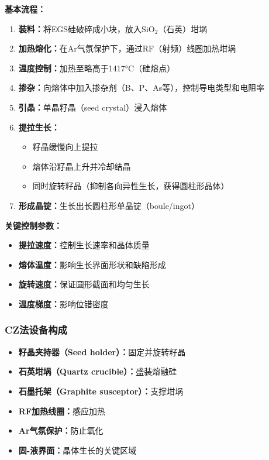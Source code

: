 \documentclass[UTF8,12pt,a4paper]{ctexart}
\begin{document}
\textbf{基本流程：}

\begin{enumerate}
    \item \textbf{装料：}将EGS硅破碎成小块，放入SiO$_2$（石英）坩埚
    \item \textbf{加热熔化：}在Ar气氛保护下，通过RF（射频）线圈加热坩埚
    \item \textbf{温度控制：}加热至略高于1417°C（硅熔点）
    \item \textbf{掺杂：}向熔体中加入掺杂剂（B、P、As等），控制导电类型和电阻率
    \item \textbf{引晶：}单晶籽晶（seed crystal）浸入熔体
    \item \textbf{提拉生长：}
    \begin{itemize}
        \item 籽晶缓慢向上提拉
        \item 熔体沿籽晶上升并冷却结晶
        \item 同时旋转籽晶（抑制各向异性生长，获得圆柱形晶体）
    \end{itemize}
    \item \textbf{形成晶锭：}生长出长圆柱形单晶锭（boule/ingot）
\end{enumerate}

\textbf{关键控制参数：}
\begin{itemize}
    \item \textbf{提拉速度：}控制生长速率和晶体质量
    \item \textbf{熔体温度：}影响生长界面形状和缺陷形成
    \item \textbf{旋转速度：}保证圆形截面和均匀生长
    \item \textbf{温度梯度：}影响位错密度
\end{itemize}

\subsubsection{CZ法设备构成}

\begin{itemize}
    \item \textbf{籽晶夹持器（Seed holder）：}固定并旋转籽晶
    \item \textbf{石英坩埚（Quartz crucible）：}盛装熔融硅
    \item \textbf{石墨托架（Graphite susceptor）：}支撑坩埚
    \item \textbf{RF加热线圈：}感应加热
    \item \textbf{Ar气氛保护：}防止氧化
    \item \textbf{固-液界面：}晶体生长的关键区域
\end{itemize}
\end{document}
